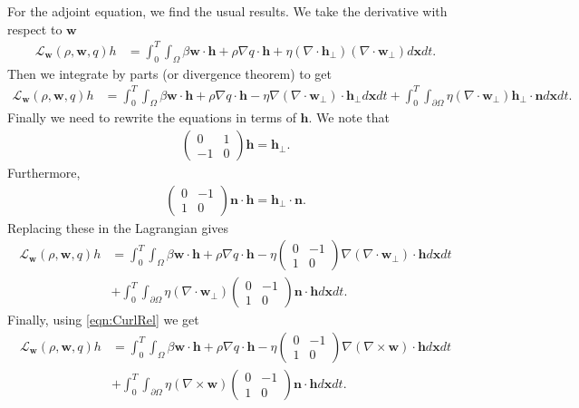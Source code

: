 \documentclass[11pt, a4paper]{article}
\theoremstyle{definition}
\newcommand{\w}{\mathbf{w}}
\newcommand{\x}{\mathbf{x}}
\newcommand{\n}{\mathbf{n}}
\newcommand{\h}{\mathbf{h}}
\begin{document}
For the adjoint equation, we find the usual results.
We take the derivative with respect to $\w$
\begin{align*}
	\mathcal L_\w(\rho, \w, q)h &= \int_0^T \int_\Omega \beta \w \cdot  \h + \rho \nabla q \cdot \h + \eta \left(\nabla \cdot  \h_\bot\right) \left(\nabla \cdot  \w_\bot\right)d\x dt.
\end{align*}
Then we integrate by parts (or divergence theorem) to get
\begin{align*}
	\mathcal L_\w(\rho, \w, q)h &= \int_0^T \int_\Omega \beta \w \cdot  \h + \rho \nabla q \cdot \h - \eta \nabla\left(\nabla \cdot  \w_\bot\right)  \cdot \h_\bot d\x dt + \int_0^T \int_{\partial \Omega} \eta \left(\nabla \cdot  \w_\bot\right) \h_\bot \cdot \n d \x dt.
\end{align*}
Finally we need to rewrite the equations in terms of $\h$. We note that 
\begin{align*}
	\begin{pmatrix}
		0 & 1\\
		-1 & 0
	\end{pmatrix} 
\h
= 
\h_\bot.
\end{align*}
Furthermore,
\begin{align*}
	\begin{pmatrix}
		0 & -1\\
		1 & 0
	\end{pmatrix} 
	\n \cdot \h
	= 
	\h_\bot \cdot \n.
\end{align*}
Replacing these in the Lagrangian gives
\begin{align*}
	\mathcal L_\w(\rho, \w, q)h &= \int_0^T \int_\Omega \beta \w \cdot  \h + \rho \nabla q \cdot \h - \eta 	\begin{pmatrix}
		0 & -1\\
		1 & 0
	\end{pmatrix} \nabla\left(\nabla \cdot  \w_\bot\right)  \cdot
	\h d\x dt \\
	&+ \int_0^T \int_{\partial \Omega} \eta \left(\nabla \cdot  \w_\bot\right) \begin{pmatrix}
		0 & -1\\
		1 & 0
	\end{pmatrix} 
	\n \cdot \h d \x dt.
\end{align*}
Finally, using \eqref{eqn:CurlRel} we get
\begin{align*}
	\mathcal L_\w(\rho, \w, q)h &= \int_0^T \int_\Omega \beta \w \cdot  \h + \rho \nabla q \cdot \h - \eta 	\begin{pmatrix}
		0 & -1\\
		1 & 0
	\end{pmatrix} \nabla\left(\nabla \times  \w\right)  \cdot
	\h d\x dt \\
	&+ \int_0^T \int_{\partial \Omega} \eta \left(\nabla \times \w\right) \begin{pmatrix}
		0 & -1\\
		1 & 0
	\end{pmatrix} 
	\n \cdot \h d \x dt.
\end{align*}
\end{document}
